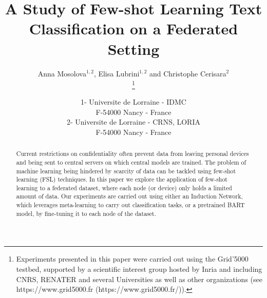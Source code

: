 \documentclass{esannV2}
\begin{document}
\title{A Study of Few-shot Learning Text Classification on a Federated Setting}


\author{Anna Mosolova$^{1, 2}$, Elisa Lubrini$^{1, 2}$ and Christophe Cerisara$^2$ 

\thanks{Experiments presented in this paper were carried out using the Grid'5000 testbed, supported by a scientific interest group hosted by Inria and including CNRS, RENATER and several Universities as well as other organizations (see https://www.grid5000.fr (https://www.grid5000.fr/)).}

\vspace{.3cm}\\
%
1- Universite de Lorraine - IDMC \\ F-54000 Nancy - France
%
\vspace{.1cm}\\
2- Universite de Lorraine - CRNS, LORIA \\ F-54000 Nancy - France\\}

\maketitle

\begin{abstract}
Current restrictions on confidentiality often prevent data from leaving personal devices and being sent to central servers on which central models are trained. The problem of machine learning being hindered by scarcity of data can be tackled using few-shot learning (FSL) techniques. In this paper we explore the application of few-shot learning to a federated dataset, where each node (or device) only holds a limited amount of data. Our experiments are carried out using either an Induction Network, which leverages meta-learning to carry out classification tasks, or a pretrained BART model, by fine-tuning it to each node of the dataset.
\end{abstract}
\end{document}
